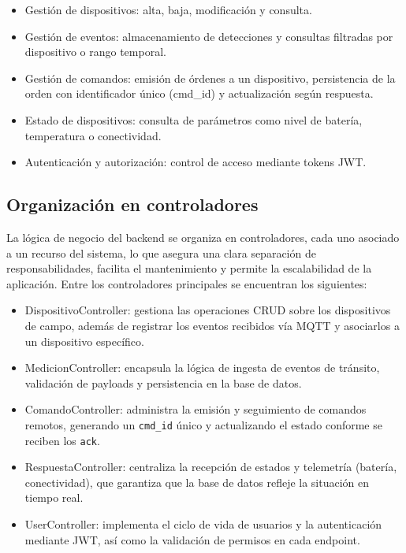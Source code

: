\begin{itemize}
    \item Gestión de dispositivos: alta, baja, modificación y consulta.
    \item Gestión de eventos: almacenamiento de detecciones y consultas filtradas por dispositivo o rango temporal.
    \item Gestión de comandos: emisión de órdenes a un dispositivo, persistencia de la orden con identificador único (cmd\_id) y actualización según respuesta.
    \item Estado de dispositivos: consulta de parámetros como nivel de batería, temperatura o conectividad.
    \item Autenticación y autorización: control de acceso mediante tokens JWT.
\end{itemize}


\subsection{Organización en controladores}

La lógica de negocio del backend se organiza en controladores, cada uno asociado a un recurso del sistema, lo que asegura una clara separación de responsabilidades, facilita el mantenimiento y permite la escalabilidad de la aplicación. Entre los controladores principales se encuentran los siguientes:

\begin{itemize}
  \item DispositivoController: gestiona las operaciones CRUD sobre los dispositivos de campo, además de registrar los eventos recibidos vía MQTT y asociarlos a un dispositivo específico.
  \item MedicionController: encapsula la lógica de ingesta de eventos de tránsito, validación de payloads y persistencia en la base de datos.
  \item ComandoController: administra la emisión y seguimiento de comandos remotos, generando un \texttt{cmd\_id} único y actualizando el estado conforme se reciben los \texttt{ack}.
  \item RespuestaController: centraliza la recepción de estados y telemetría (batería, conectividad), que garantiza que la base de datos refleje la situación en tiempo real.
  \item UserController: implementa el ciclo de vida de usuarios y la autenticación mediante JWT\cite{jwtRFC7519}, así como la validación de permisos en cada endpoint.
\end{itemize}

